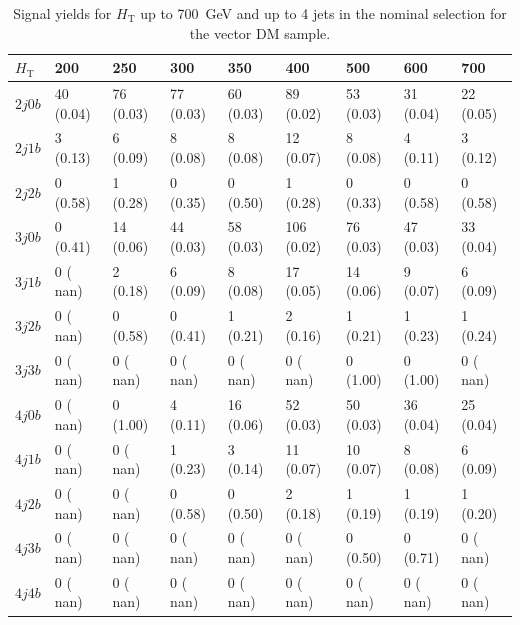\begin{table}[h]
\small
\begin{tabular}{lllllllll}
\hline \hline
$H_\textrm{T}$                 &     200 &            250 &             300&             350&             400&             500&             600&             700  \\\hline\hline
$2j 0b$&          40 (0.04)&	   76 (0.03)&	   77 (0.03)&	   60 (0.03)&	   89 (0.02)&	   53 (0.03)&	   31 (0.04)&	   22 (0.05) \\\hline
$2j 1b$&           3 (0.13)&	    6 (0.09)&	    8 (0.08)&	    8 (0.08)&	   12 (0.07)&	    8 (0.08)&	    4 (0.11)&	    3 (0.12) \\\hline
$2j 2b$&           0 (0.58)&	    1 (0.28)&	    0 (0.35)&	    0 (0.50)&	    1 (0.28)&	    0 (0.33)&	    0 (0.58)&	    0 (0.58) \\\hline
$3j 0b$&           0 (0.41)&	   14 (0.06)&	   44 (0.03)&	   58 (0.03)&	  106 (0.02)&	   76 (0.03)&	   47 (0.03)&	   33 (0.04) \\\hline
$3j 1b$&           0 ( nan)&	    2 (0.18)&	    6 (0.09)&	    8 (0.08)&	   17 (0.05)&	   14 (0.06)&	    9 (0.07)&	    6 (0.09) \\\hline
$3j 2b$&           0 ( nan)&	    0 (0.58)&	    0 (0.41)&	    1 (0.21)&	    2 (0.16)&	    1 (0.21)&	    1 (0.23)&	    1 (0.24) \\\hline
$3j 3b$&           0 ( nan)&	    0 ( nan)&	    0 ( nan)&	    0 ( nan)&	    0 ( nan)&	    0 (1.00)&	    0 (1.00)&	    0 ( nan) \\\hline
$4j 0b$&           0 ( nan)&	    0 (1.00)&	    4 (0.11)&	   16 (0.06)&	   52 (0.03)&	   50 (0.03)&	   36 (0.04)&	   25 (0.04) \\\hline
$4j 1b$&           0 ( nan)&	    0 ( nan)&	    1 (0.23)&	    3 (0.14)&	   11 (0.07)&	   10 (0.07)&	    8 (0.08)&	    6 (0.09) \\\hline
$4j 2b$&           0 ( nan)&	    0 ( nan)&	    0 (0.58)&	    0 (0.50)&	    2 (0.18)&	    1 (0.19)&	    1 (0.19)&	    1 (0.20) \\\hline
$4j 3b$&           0 ( nan)&	    0 ( nan)&	    0 ( nan)&	    0 ( nan)&	    0 ( nan)&	    0 (0.50)&	    0 (0.71)&	    0 ( nan) \\\hline
$4j 4b$&           0 ( nan)&	    0 ( nan)&	    0 ( nan)&	    0 ( nan)&	    0 ( nan)&	    0 ( nan)&	    0 ( nan)&	    0 ( nan) \\\hline
\hline
\end{tabular}
\caption{Signal yields for $H_\textrm{T}$ up to 700~GeV and up to 4 jets in the nominal selection for the vector DM sample.}
\label{tab:sig_yields_VDM_nom}
\end{table}

